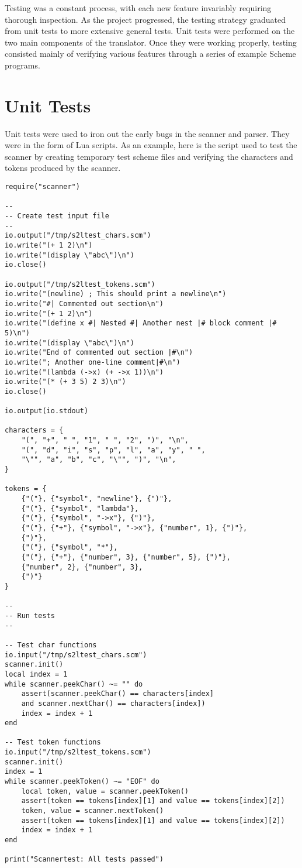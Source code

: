 Testing was a constant process, with each new feature invariably requiring
thorough inspection. As the project progressed, the testing strategy graduated
from unit tests to more extensive general tests. Unit tests were performed on
the two main components of the translator. Once they were working properly,
testing consisted mainly of verifying various features through a series of
example Scheme programs.


\section{Unit Tests}
Unit tests were used to iron out the early bugs in the scanner and parser. They
were in the form of Lua scripts. As an example, here is the script used to test
the scanner by creating temporary test scheme files and verifying the characters
and tokens produced by the scanner.
\begin{framed}
\scriptsize
\begin{verbatim}
require("scanner")

--
-- Create test input file
--
io.output("/tmp/s2ltest_chars.scm")
io.write("(+ 1 2)\n")
io.write("(display \"abc\")\n")
io.close()

io.output("/tmp/s2ltest_tokens.scm")
io.write("(newline) ; This should print a newline\n")
io.write("#| Commented out section\n")
io.write("(+ 1 2)\n")
io.write("(define x #| Nested #| Another nest |# block comment |# 5)\n")
io.write("(display \"abc\")\n")
io.write("End of commented out section |#\n")
io.write("; Another one-line comment|#\n")
io.write("(lambda (->x) (+ ->x 1))\n")
io.write("(* (+ 3 5) 2 3)\n")
io.close()

io.output(io.stdout)

characters = {
    "(", "+", " ", "1", " ", "2", ")", "\n",
    "(", "d", "i", "s", "p", "l", "a", "y", " ",
    "\"", "a", "b", "c", "\"", ")", "\n", 
}

tokens = {
    {"("}, {"symbol", "newline"}, {")"},
    {"("}, {"symbol", "lambda"},
	{"("}, {"symbol", "->x"}, {")"},
	{"("}, {"+"}, {"symbol", "->x"}, {"number", 1}, {")"},
    {")"},
    {"("}, {"symbol", "*"},
	{"("}, {"+"}, {"number", 3}, {"number", 5}, {")"},
	{"number", 2}, {"number", 3},
    {")"}
}

--
-- Run tests
--

-- Test char functions
io.input("/tmp/s2ltest_chars.scm")
scanner.init()
local index = 1
while scanner.peekChar() ~= "" do
    assert(scanner.peekChar() == characters[index]
    and scanner.nextChar() == characters[index])
    index = index + 1
end

-- Test token functions
io.input("/tmp/s2ltest_tokens.scm")
scanner.init()
index = 1
while scanner.peekToken() ~= "EOF" do
    local token, value = scanner.peekToken()
    assert(token == tokens[index][1] and value == tokens[index][2])
    token, value = scanner.nextToken()
    assert(token == tokens[index][1] and value == tokens[index][2])
    index = index + 1
end

print("Scannertest: All tests passed")
\end{verbatim}
\end{framed}


